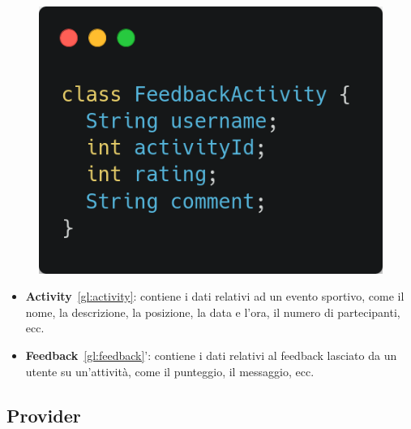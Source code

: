 \documentclass[a4paper,12pt]{article}
\begin{document}
\begin{figure}[h]
\begin{minipage}{0.45\textwidth}
        \includegraphics[width=0.9\linewidth]{img/feedback.png}
    \end{minipage}
\end{figure}


\begin{itemize}
    \item \textbf{Activity}~\ref{gl:activity}: contiene i dati relativi ad un evento sportivo, come il nome, la descrizione, la posizione, la data e l'ora, il numero di partecipanti, ecc.
    \item \textbf{Feedback}~\ref{gl:feedback}': contiene i dati relativi al feedback lasciato da un utente su un'attività, come il punteggio, il messaggio, ecc. 
\end{itemize}

\newpage

\subsection{Provider}
\end{document}
